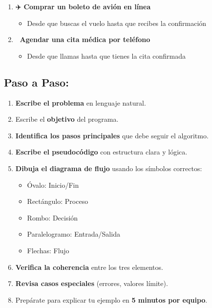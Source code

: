 \documentclass[
  spanish,
  12pt,
  letterpaper,
  DIV=11,
  numbers=noendperiod]{scrreprt}
\providecommand{\tightlist}{%
  \setlength{\itemsep}{0pt}\setlength{\parskip}{0pt}}
\begin{document}
\begin{enumerate}
  \begin{itemize}
  \tightlist
  \item
    Desde que abres la aplicación hasta que la película está
    reproduciéndose
  \end{itemize}
\item
  ✈️ \textbf{Comprar un boleto de avión en línea}

  \begin{itemize}
  \tightlist
  \item
    Desde que buscas el vuelo hasta que recibes la confirmación
  \end{itemize}
\item
  🏥 \textbf{Agendar una cita médica por teléfono}

  \begin{itemize}
  \tightlist
  \item
    Desde que llamas hasta que tienes la cita confirmada
  \end{itemize}
\end{enumerate}

\subsection{\texorpdfstring{\textbf{Paso a
Paso:}}{Paso a Paso:}}\label{paso-a-paso}

\begin{enumerate}
\def\labelenumi{\arabic{enumi}.}
\tightlist
\item
  \textbf{Escribe el problema} en lenguaje natural.
\item
  Escribe el \textbf{objetivo} del programa.
\item
  \textbf{Identifica los pasos principales} que debe seguir el
  algoritmo.
\item
  \textbf{Escribe el pseudocódigo} con estructura clara y lógica.
\item
  \textbf{Dibuja el diagrama de flujo} usando los símbolos correctos:

  \begin{itemize}
  \tightlist
  \item
    Óvalo: Inicio/Fin
  \item
    Rectángulo: Proceso
  \item
    Rombo: Decisión
  \item
    Paralelogramo: Entrada/Salida
  \item
    Flechas: Flujo
  \end{itemize}
\item
  \textbf{Verifica la coherencia} entre los tres elementos.
\item
  \textbf{Revisa casos especiales} (errores, valores límite).
\item
  Prepárate para explicar tu ejemplo en \textbf{5 minutos por equipo}.
\end{enumerate}
\end{document}
